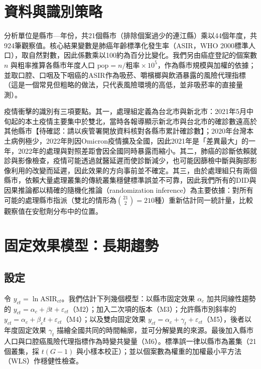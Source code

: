 \documentclass[UTF8,a4paper,11pt]{ctexart}
\newcommand{\note}[1]{\textcolor{red!60!black}{【待確認：#1】}}
\begin{document}
\section{資料與識別策略}
分析單位是縣市—年份，共21個縣市（排除個案過少的連江縣）乘以44個年度，共924筆觀察值。核心結果變數是肺癌年齡標準化發生率（ASIR，WHO 2000標準人口），取自然對數，因此係數乘以100約為百分比變化。我們另由癌症登記的個案數 $n$ 與粗率推算各縣市年度人口 $\text{pop}=n/\text{粗率}\times10^5$，作為縣市規模與加權的依據；並取口腔、口咽及下咽癌的ASIR作為吸菸、嚼檳榔與飲酒暴露的風險代理指標（這是一個常見但粗略的做法，只代表風險環境的高低，並非吸菸率的直接量測）。

疫情衝擊的識別有三項要點。其一，處理組定義為台北市與新北市：2021年5月中旬起的本土疫情主要集中於雙北，當時各報導顯示新北市與台北市的確診數遠高於其他縣市\note{請以疾管署開放資料核對各縣市累計確診數}；2020年台灣本土病例極少，2022年則因Omicron疫情擴及全國，因此2021年是「差異最大」的一年，2022年的處理與對照差距會因全國同時暴露而縮小。其二，肺癌的診斷依賴就診與影像檢查，疫情可能透過就醫延遲而使診斷減少，也可能因篩檢中斷與胸部影像利用的改變而延遲，因此效果的方向事前並不確定。其三，由於處理組只有兩個縣市，依賴大量處理叢集的傳統叢集穩健標準誤並不可靠，因此我們所有的DID與因果推論都以精確的隨機化推論（randomization inference）為主要依據：對所有可能的處理縣市指派（雙北的情形為$\binom{21}{2}=210$種）重新估計同一統計量，比較觀察值在安慰劑分布中的位置。

\section{固定效果模型：長期趨勢}
\subsection{設定}
令 $y_{ct}=\ln \mathrm{ASIR}_{ct}$。我們估計下列幾個模型：以縣市固定效果 $\alpha_c$ 加共同線性趨勢的 $y_{ct}=\alpha_c+\beta t+\varepsilon_{ct}$（M2）；加入二次項的版本（M3）；允許縣市別斜率的 $y_{ct}=\alpha_c+\beta_c t+\varepsilon_{ct}$（M4）；以及雙向固定效果 $y_{ct}=\alpha_c+\gamma_t+\varepsilon_{ct}$（M5），後者以年度固定效果 $\gamma_t$ 描繪全國共同的時間輪廓，並可分解變異的來源。最後加入縣市人口與口腔癌風險代理指標作為時變共變量（M6）。標準誤一律以縣市為叢集（21個叢集，採 $t(G-1)$ 與小樣本校正）；並以個案數為權重的加權最小平方法（WLS）作穩健性檢查。
\end{document}
